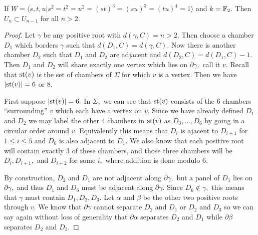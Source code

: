 \documentclass[class=book, crop=false]{standalone}
\begin{document}
\begin{theorem}
	\label{334f2fg}
	If $W=\langle s,t,u|s^2=t^2=u^2=(st)^3=(su)^3=(tu)^4=1\rangle$ and $k=\mathbb{F}_{2}.$ Then $U_n\subset U_{n-1}$ for all $n>2.$
\end{theorem}
\begin{proof}
	Let $\gamma$ be any positive root with $d(\gamma,C)=n>2.$ Then choose a chamber $D_1$ which borders $\gamma$ such that $d(D_1,C)=d(\gamma,C).$ Now there is another chamber $D_2$ such that $D_1$ and $D_2$ are adjacent and $d(D_2,C)=d(D_1,C)-1.$ Then $D_1$ and $D_2$ will share exactly one vertex which lies on $\partial \gamma,$ call it $v.$ Recall that $\mathrm{st}(v)$ is the set of chambers of $\Sigma$ for which $v$ is a vertex. Then we have $|\mathrm{st}(v)|=6$ or $8.$

	First suppose $|\mathrm{st}(v)|=6.$ In $\Sigma,$ we can see that $\mathrm{st}(v)$ consists of the 6 chambers ``surrounding'' $v$ which each have a vertex on $v.$ Since we have already defined $D_1$ and $D_2$ we may label the other 4 chambers in $\mathrm{st}(v)$ as $D_3,\dots,D_6$ by going in a circular order around $v.$ Equivalently this means that $D_i$ is ajacent to $D_{i+1}$ for $1\le i\le 5$ and $D_6$ is also adjacent to $D_1.$ We also know that each positive root will contain exactly 3 of these chambers, and those three chambers will be $D_i,D_{i+1},$ and $D_{i+2}$ for some $i,$ where addition is done modulo 6.

	By construction, $D_2$ and $D_1$ are not adjacent along $\partial \gamma,$ but a panel of $D_1$ lies on $\partial \gamma,$ and thus $D_1$ and $D_6$ must be adjacent along $\partial\gamma.$ Since $D_6\not\in \gamma,$ this means that $\gamma$ must contain $D_1,D_2,D_3.$ Let $\alpha$ and $\beta$ be the other two positive roots through $v.$ We know that $\partial\gamma$ cannot separate $D_2$ and $D_1$ or $D_2$ and $D_3$ so we can say again without loss of generality that $\partial\alpha$ separates $D_2$ and $D_1$ while $\partial\beta$ separates $D_2$ and $D_3.$ 


\end{proof}
\end{document}
